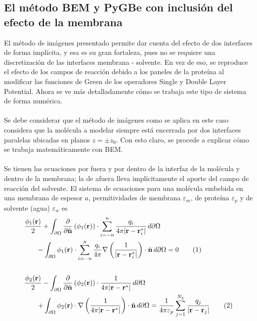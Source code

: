 \documentclass[12pt, twoside, onehalfspace, numbers, spanish]{ezthesis}
\newcommand\numberthis{\addtocounter{equation}{1}\tag{\theequation}}
\numberwithin{equation}{section}
\begin{document}
\subsection{El método BEM y PyGBe con inclusión del efecto de la membrana} \label{subsec:BEM_PyGBE}
El método de imágenes presentado permite dar cuenta del efecto de dos interfaces de forma implícita, y esa es su gran fortaleza, pues no se requiere una discretización de las interfaces membrana - solvente. En vez de eso, se reproduce el efecto de los campos de reacción debido a los paneles de la proteína al modificar las funciones de Green de los operadores Single y Double Layer Potential. Ahora se ve más detalladamente cómo se trabaja este tipo de sistema de forma numérica.\\\\
Se debe considerar que el método de imágenes como se aplica en este caso considera que la molécula a modelar siempre está encerrada por dos interfaces paralelas ubicadas en planos $z = \pm z_0$. Con esto claro, se procede a explicar cómo se trabaja matemáticamente con BEM.\\\\
Se tienen las ecuaciones por fuera y por dentro de la interfaz de la molécula y dentro de la membrana; la de afuera lleva implícitamente el aporte del campo de reacción del solvente. El sistema de ecuaciones para una molécula embebida en una membrana de espesor $a$, permitividades de membrana $\varepsilon_m$, de proteína $\varepsilon_p$ y de solvente (agua) $\varepsilon_w$ es
\begin{align*}
\frac{\phi_1(\mathbf{r})}{2} + \int_{\partial\Omega}\frac{\partial}{\partial\hat{\mathbf{n}}}&\left(\phi_1(\mathbf{r})\right)\cdot\sum_{i=-n}^{n}\frac{q_i}{4\pi|\mathbf{r} - \mathbf{r}_i^*|}\, d\partial\Omega \\
 - \int_{\partial\Omega}\phi_1(\mathbf{r})&\cdot\sum_{i = -n}^{n}\frac{q_i}{4\pi}\nabla\left(\frac{1}{|\mathbf{r} - \mathbf{r}_i^*|}\right)\cdot\hat{\mathbf{n}}\, d\partial\Omega = 0\numberthis \label{eqn:membrane1} \\\\
\frac{\phi_2(\mathbf{r})}{2} - \int_{\partial\Omega}\frac{\partial}{\partial\hat{\mathbf{n}}}&\left(\phi_2(\mathbf{r})\right)\cdot\frac{1}{4\pi|\mathbf{r} - \mathbf{r}^*|}\, d\partial\Omega\\
+ \int_{\partial\Omega}\phi_2(\mathbf{r})&\cdot\nabla\left(\frac{1}{4\pi|\mathbf{r} - \mathbf{r}^*|}\right)\cdot\hat{\mathbf{n}}\, d\partial\Omega = \frac{1}{4\pi\varepsilon_p}\sum_{j = 1}^{N_q}\frac{q_j}{|\mathbf{r} - \mathbf{r}_j|} \numberthis \label{eqn:membrane2}
\end{align*}
\end{document}
